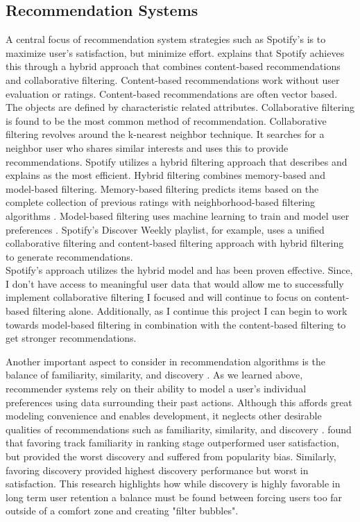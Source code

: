 \documentclass[10pt,twocolumn]{article}
\begin{document}
\subsection{Recommendation Systems}
A central focus of recommendation system strategies such as Spotify's is to maximize user's satisfaction, but minimize effort. \textcite{MadathilSpotifyCF} explains that Spotify achieves this through a hybrid approach that combines content-based recommendations and collaborative filtering. Content-based recommendations work without user evaluation or ratings. Content-based recommendations are often vector based. The objects are defined by characteristic related attributes. Collaborative filtering is found to be the most common method of recommendation. Collaborative filtering revolves around the k-nearest neighbor technique. It searches for a neighbor user who shares similar interests and uses this to provide recommendations. Spotify utilizes a hybrid filtering approach that \textcite{MadathilSpotifyCF} describes and explains as the most efficient. Hybrid filtering combines memory-based and model-based filtering. Memory-based filtering predicts items based on the complete collection of previous ratings with neighborhood-based filtering algorithms \cite{MadathilSpotifyCF}. Model-based filtering uses machine learning to train and model user preferences \cite{MadathilSpotifyCF}. Spotify's Discover Weekly playlist, for example, uses a unified collaborative filtering and content-based filtering approach with hybrid filtering to generate recommendations.\\

\indent Spotify's approach utilizes the hybrid model and has been proven effective. Since, I don't have access to meaningful user data that would allow me to successfully implement collaborative filtering I focused and will continue to focus on content-based filtering alone. Additionally, as I continue this project I can begin to work towards model-based filtering in combination with the content-based filtering to get stronger recommendations. 

\indent Another important aspect to consider in recommendation algorithms is the balance of familiarity, similarity, and discovery \cite{MehrotraAlgorithmicBalance}. As we learned above, recommender systems rely on their ability to model a user's individual preferences using data surrounding their past actions. Although this affords great modeling convenience and enables development, it neglects other desirable qualities of recommendations such as familiarity, similarity, and discovery \cite{MehrotraAlgorithmicBalance}. \textcite{MehrotraAlgorithmicBalance} found that favoring track familiarity in ranking stage outperformed user satisfaction, but provided the worst discovery and suffered from popularity bias. Similarly, favoring discovery provided highest discovery performance but worst in satisfaction. This research highlights how while discovery is highly favorable in long term user retention a balance must be found between forcing users too far outside of a comfort zone and creating "filter bubbles".\\
\end{document}
